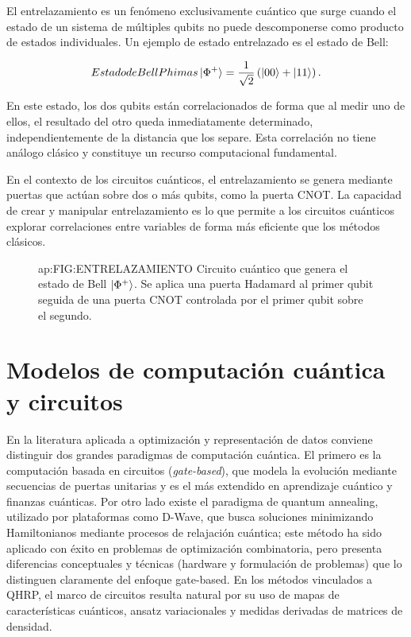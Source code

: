 El entrelazamiento es un fenómeno exclusivamente cuántico que surge cuando el estado de un sistema de múltiples qubits no puede descomponerse como producto de estados individuales. Un ejemplo de estado entrelazado es el estado de Bell:

\begin{equation}[ap:eq:bell]{Estado de Bell Phi mas}
\ket{\Phi^+} = \frac{1}{\sqrt{2}}\left(\ket{00} + \ket{11}\right).
\end{equation}

En este estado, los dos qubits están correlacionados de forma que al medir uno de ellos, el resultado del otro queda inmediatamente determinado, independientemente de la distancia que los separe. Esta correlación no tiene análogo clásico y constituye un recurso computacional fundamental.

En el contexto de los circuitos cuánticos, el entrelazamiento se genera mediante puertas que actúan sobre dos o más qubits, como la puerta CNOT. La capacidad de crear y manipular entrelazamiento es lo que permite a los circuitos cuánticos explorar correlaciones entre variables de forma más eficiente que los métodos clásicos.

\begin{figure}[Estado de Bell]{ap:FIG:ENTRELAZAMIENTO}
{Circuito cuántico que genera el estado de Bell $\ket{\Phi^+}$.
Se aplica una puerta Hadamard al primer qubit seguida de una puerta CNOT
controlada por el primer qubit sobre el segundo.}
\end{figure}

\section{Modelos de computación cuántica y circuitos}
\label{ap:sec:modelos_computacion_cuantica}
En la literatura aplicada a optimización y representación de datos conviene distinguir dos grandes paradigmas de computación cuántica. El primero es la computación basada en circuitos (\textit{gate-based}), que modela la evolución mediante secuencias de puertas unitarias y es el más extendido en aprendizaje cuántico y finanzas cuánticas. Por otro lado existe el paradigma de quantum annealing, utilizado por plataformas como D-Wave, que busca soluciones minimizando Hamiltonianos mediante procesos de relajación cuántica; este método ha sido aplicado con éxito en problemas de optimización combinatoria, pero presenta diferencias conceptuales y técnicas (hardware y formulación de problemas) que lo distinguen claramente del enfoque gate-based. En los métodos vinculados a QHRP, el marco de circuitos resulta natural por su uso de mapas de características cuánticos, ansatz variacionales y medidas derivadas de matrices de densidad.

